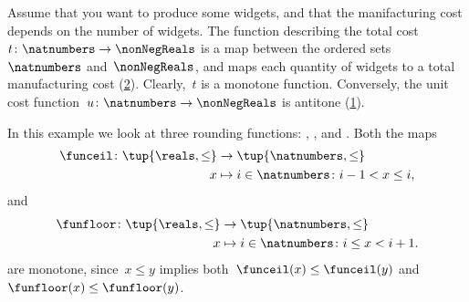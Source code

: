 \begin{comment}
  A monotone map is an \emph{order isomorphism} if the other direction
  of the implication holds as well:
  \begin{equation}
    a \leq_A b \quad \Leftrightarrow \quad f(a) \leq_B f(b).
  \end{equation}
\end{comment}

\begin{example}
  Assume that you want to produce some widgets, and that the manifacturing cost depends on the number of widgets.
  The function describing the total cost~$t\colon \natnumbers\to \nonNegReals$ is a map between the ordered sets~$\natnumbers$ and~$\nonNegReals$, and maps each quantity of widgets to a total manufacturing cost (\cref{fig:total_manufacturing}).
  Clearly,~$t$ is a monotone function.
  Conversely, the unit cost function~$u\colon \natnumbers\to \nonNegReals$ is antitone (\cref{fig:unit_manufacturing}).
\end{example}

\begin{figure}[h!]
  \caption{}
  \label{fig:unit_manufacturing}
\end{figure}

\begin{figure}[h!]
  \caption{}
  \label{fig:total_manufacturing}
\end{figure}



\begin{example}
  \label{ex:rounding-functions}
  In this example we look at three rounding functions: \funceil, \funfloor, and \rtntte. Both the maps
  \begin{equation*}
    \begin{aligned}
      \funceil\colon \tup{\reals,\leq}&\to \tup{\natnumbers,\leq}\\
      x&\mapsto i \in \natnumbers \colon i-1<x\leq i,
    \end{aligned}
  \end{equation*}
  and
  \begin{equation*}
    \begin{aligned}
      \funfloor\colon \tup{\reals,\leq}&\to \tup{\natnumbers,\leq}\\
      x&\mapsto i \in \natnumbers \colon i\leq x< i+1.
    \end{aligned}
  \end{equation*}
  are monotone, since~$x\leq y$ implies both~$\funceil(x)\leq \funceil(y)$ and~$\funfloor(x)\leq\funfloor(y)$.
\end{example}

